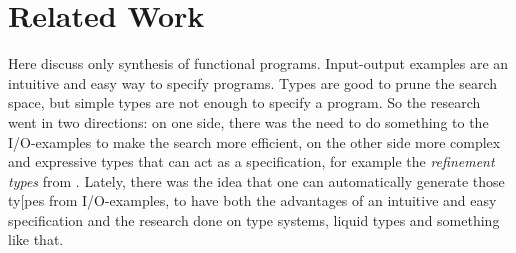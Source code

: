 \chapter{Related Work} \label{relatedwork}

Here discuss only synthesis of functional programs. Input-output examples are an intuitive and easy way to specify programs. Types are good to prune the search space, but simple types are not enough to specify a program. So the research went in two directions: on one side, there was the need to do something to the I/O-examples to make the search more efficient, on the other side more complex and expressive types that can act as a specification, for example the \emph{refinement types} from \cite{SynquidPaper}. Lately, there was the idea that one can automatically generate those ty[pes from I/O-examples, to have both the advantages of an intuitive and easy specification and the research done on type systems, liquid types and something like that.


